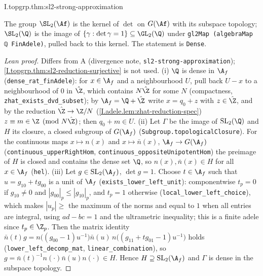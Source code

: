 \begin{theorem}
\end{theorem}
\begin{tfformal}{I.topgrp.thm:sl2-strong-approximation}
\begin{tffidelity}
The group $\SL_2(\Af)$ is the kernel of $\det$ on $G(\Af)$ with its subspace topology; $\SL_2(\Q)$ is the image of $\{\gamma:\det\gamma=1\}\subseteq\GL_2(\Q)$ under \texttt{gl2Map (algebraMap ℚ FinAdele)}, pulled back to this kernel. The statement is \texttt{Dense}.
\end{tffidelity}
\end{tfformal}
\begin{proof}[Lean proof]
Differs from A (divergence note, \texttt{sl2-strong-approximation}); \cref{I.topgrp.thm:sl2-reduction-surjective} is not used. (i) $\Q$ is dense in $\A_f$ (\texttt{dense\_rat\_finAdele}): for $x\in\A_f$ and a neighbourhood $U$, pull back $U-x$ to a neighbourhood of $0$ in $\hat\Z$, which contains $N\hat\Z$ for some $N$ (compactness, \texttt{zhat\_exists\_dvd\_subset}); by $\A_f=\Q+\hat\Z$ write $x=q_0+z$ with $z\in\hat\Z$, and by the reduction $\hat\Z\to\Z/N$ (\cref{I.adele.lem:zhat-reduction-spec}) $z\equiv m\in\Z\pmod{N\hat\Z}$; then $q_0+m\in U$. (ii) Let $\Gamma$ be the image of $\mathrm{SL}_2(\Q)$ and $H$ its closure, a closed subgroup of $G(\A_f)$ (\texttt{Subgroup.topologicalClosure}). For the continuous maps $x\mapsto n(x)$ and $x\mapsto\bar n(x)$, $\A_f\to G(\A_f)$ (\texttt{continuous\_upperRightHom}, \texttt{continuous\_oppositeUnipotentHom}) the preimage of $H$ is closed and contains the dense set $\Q$, so $n(x),\bar n(x)\in H$ for all $x\in\A_f$ (\texttt{hel}). (iii) Let $g\in\mathrm{SL}_2(\A_f)$, $\det g=1$. Choose $t\in\A_f$ such that $u=g_{10}+tg_{00}$ is a unit of $\A_f$ (\texttt{exists\_lower\_left\_unit}): componentwise $t_p=0$ if $g_{10}\ne0$ and $|g_{00}|_p\le|g_{10}|_p$, and $t_p=1$ otherwise (\texttt{local\_lower\_left\_choice}), which makes $|u_p|\ge$ the maximum of the norms and equal to $1$ when all entries are integral, using $ad-bc=1$ and the ultrametric inequality; this is a finite adele since $t_p\in\Z_p$. Then the matrix identity $\bar n(t)g=n\bigl((g_{00}-1)u^{-1}\bigr)\bar n(u)\,n\bigl((g_{11}+tg_{01}-1)u^{-1}\bigr)$ holds (\texttt{lower\_left\_decomp\_mat}, \texttt{linear\_combination}), so $g=\bar n(t)^{-1}n(\cdot)\bar n(u)n(\cdot)\in H$. Hence $H\supseteq\mathrm{SL}_2(\A_f)$ and $\Gamma$ is dense in the subspace topology.
\end{proof}

